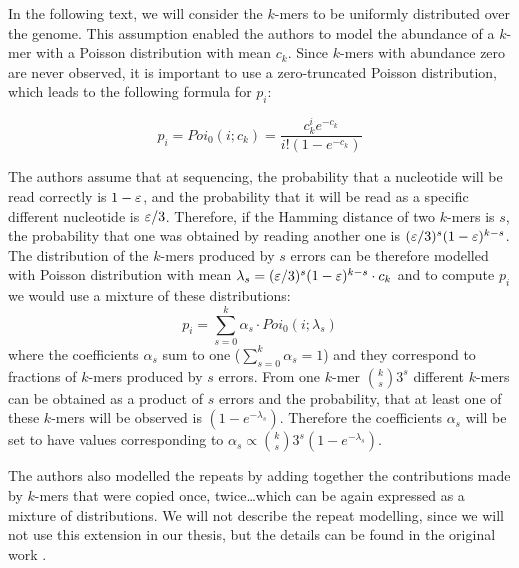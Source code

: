 In the following text, we will consider the $k$-mers to be uniformly distributed
over the genome. This assumption enabled the authors to model the abundance of a $k$-mer
with a Poisson distribution with mean $c_k$. Since $k$-mers with abundance zero are never
observed, it is important to use a zero-truncated Poisson distribution, 
which leads to the following formula for $p_i$:

$$ p_i = Poi_0(i; c_k) = \frac{c_k^i e^{-c_k}}{i!(1 - e^{-c_k})} $$

The authors assume that at sequencing, the probability that a nucleotide will be read
correctly is $1-\varepsilon$, and the probability that it will be read as a specific different
nucleotide is $\varepsilon/3$. Therefore, if the Hamming distance of two $k$-mers is $s$, the
probability that one was obtained by reading another one is $(\varepsilon/3)^s(1-\varepsilon)^{k-s}$.
The distribution of the $k$-mers produced by $s$ errors can be
therefore modelled with Poisson distribution with mean 
$\lambda_s = (\varepsilon/3)^s(1-\varepsilon)^{k-s} \cdot c_k$ and to compute $p_i$ we would use
a mixture of these distributions:
$$ p_i = \sum_{s=0}^k \alpha_s \cdot Poi_0(i; \lambda_s) $$
where the coefficients $\alpha_s$ sum to one ($\sum_{s=0}^k \alpha_s = 1$) and they correspond
to fractions of $k$-mers produced by $s$ errors. From one $k$-mer ${k \choose s} 3^s$ 
different $k$-mers can be obtained as a product of $s$ errors and the probability, 
that at least one of these $k$-mers will be observed is $(1 - e^{-\lambda_s})$. 
Therefore the coefficients $\alpha_s$ will be set to have values corresponding to 
$\alpha_s \propto {k \choose s} 3^s(1 - e^{-\lambda_s})$.

The authors also modelled the repeats by adding together the contributions made by
$k$-mers that were copied once, twice\dots which can be again expressed as a mixture of
distributions. We will not describe the repeat modelling, since we will not use this extension
in our thesis, but the details can be found in the original work \cite{Hozza2015, Hozza2016}.  


